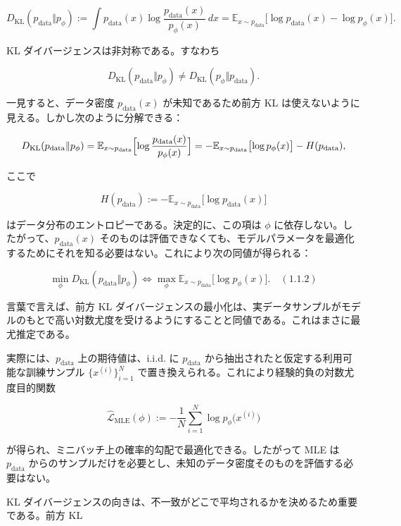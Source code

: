 \[
D_{\mathrm{KL}}(p_{\mathrm{data}} \Vert p_\phi) := \int p_{\mathrm{data}}(x) \log \frac{p_{\mathrm{data}}(x)}{p_\phi(x)}\, dx
= \mathbb{E}_{x\sim p_{\mathrm{data}}}\bigl[\log p_{\mathrm{data}}(x) - \log p_\phi(x)\bigr].
\]


KL ダイバージェンスは非対称である。すなわち

\[
D_{\mathrm{KL}}(p_{\mathrm{data}} \Vert p_\phi) \neq D_{\mathrm{KL}}(p_\phi \Vert p_{\mathrm{data}}).
\]


一見すると、データ密度 $p_{\mathrm{data}}(x)$ が未知であるため前方 KL は使えないように見える。しかし次のように分解できる：

\[
D_{\mathrm{KL}}(p_{\mathrm{data}} \Vert p_\phi)
= \mathbb{E}_{x\sim p_{\mathrm{data}}}\Bigl[\log \frac{p_{\mathrm{data}}(x)}{p_\phi(x)}\Bigr]
= -\mathbb{E}_{x\sim p_{\mathrm{data}}}\bigl[\log p_\phi(x)\bigr] - H(p_{\mathrm{data}}),
\]


ここで

\[
H(p_{\mathrm{data}}) := -\mathbb{E}_{x\sim p_{\mathrm{data}}}\bigl[\log p_{\mathrm{data}}(x)\bigr]
\]


はデータ分布のエントロピーである。決定的に、この項は $\phi$ に依存しない。したがって、$p_{\mathrm{data}}(x)$ そのものは評価できなくても、モデルパラメータを最適化するためにそれを知る必要はない。これにより次の同値が得られる：

\begin{propositionbox}
\[
\min_\phi D_{\mathrm{KL}}(p_{\mathrm{data}} \Vert p_\phi)
\iff
\max_\phi \mathbb{E}_{x\sim p_{\mathrm{data}}}\bigl[\log p_\phi(x)\bigr]. \quad (1.1.2)
\]
\end{propositionbox}


言葉で言えば、前方 KL ダイバージェンスの最小化は、実データサンプルがモデルのもとで高い対数尤度を受けるようにすることと同値である。これはまさに最尤推定である。

実際には、$p_{\mathrm{data}}$ 上の期待値は、i.i.d. に $p_{\mathrm{data}}$ から抽出されたと仮定する利用可能な訓練サンプル $\{x^{(i)}\}_{i=1}^{N}$ で置き換えられる。これにより経験的負の対数尤度目的関数

\[
\hat{\mathcal{L}}_{\mathrm{MLE}}(\phi) := -\frac{1}{N}\sum_{i=1}^{N}\log p_\phi\bigl(x^{(i)}\bigr)
\]


が得られ、ミニバッチ上の確率的勾配で最適化できる。したがって MLE は $p_{\mathrm{data}}$ からのサンプルだけを必要とし、未知のデータ密度そのものを評価する必要はない。


KL ダイバージェンスの向きは、不一致がどこで平均されるかを決めるため重要である。前方 KL

